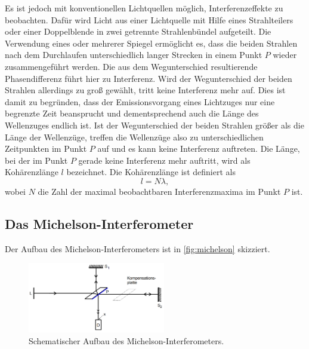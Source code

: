 Es ist jedoch mit konventionellen Lichtquellen möglich, Interferenzeffekte zu beobachten. Dafür wird Licht aus einer 
Lichtquelle mit Hilfe eines Strahlteilers oder einer Doppelblende in zwei getrennte Strahlenbündel aufgeteilt. Die 
Verwendung eines oder mehrerer Spiegel ermöglicht es, dass die beiden Strahlen nach dem Durchlaufen unterschiedlich 
langer Strecken in einem Punkt $P$ wieder zusammengeführt werden. Die aus dem Wegunterschied resultierende 
Phasendifferenz führt hier zu Interferenz. 
Wird der Wegunterschied der beiden Strahlen allerdings zu groß gewählt, tritt keine Interferenz mehr auf. Dies ist damit
zu begründen, dass der Emissionsvorgang eines Lichtzuges nur eine begrenzte Zeit beansprucht und dementsprechend auch die
Länge des Wellenzuges endlich ist. Ist der Wegunterschied der beiden Strahlen größer als die Länge der Wellenzüge, treffen
die Wellenzüge also zu unterschiedlichen Zeitpunkten im Punkt $P$ auf und es kann keine Interferenz auftreten. Die
Länge, bei der im Punkt $P$ gerade keine Interferenz mehr auftritt, wird als Kohärenzlänge $l$ bezeichnet. 
Die Kohärenzlänge ist definiert als
\begin{equation}
    l = N \lambda ,
\end{equation}
wobei $N$ die Zahl der maximal beobachtbaren Interferenzmaxima im Punkt $P$ ist. 

\subsection{Das Michelson-Interferometer}
\label{ssec:Michelson}

Der Aufbau des Michelson-Interferometers ist in \autoref{fig:michelson} skizziert. 

\begin{figure}[h]
    \centering
    \includegraphics[width=6cm]{content/michelson.png}
    \caption{Schematischer Aufbau des Michelson-Interferometers. \cite{sample}}
    \label{fig:michelson}
  \end{figure}

